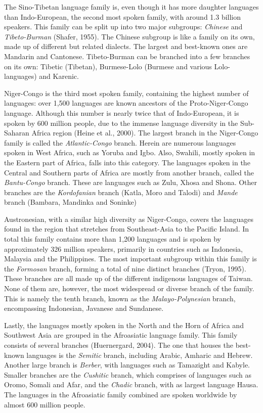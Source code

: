 The Sino-Tibetan language family is, even though it has more daughter languages than Indo-European, the second most spoken family, with around 1.3 billion speakers. This family can be split up into two major subgroups: \textit{Chinese} and \textit{Tibeto-Burman}  (Shafer, 1955). The Chinese subgroup is like a family on its own, made up of different but related dialects. The largest and best-known ones are Mandarin and Cantonese. Tibeto-Burman can be branched into a few branches on its own: Tibetic (Tibetan), Burmese-Lolo (Burmese and various Lolo-languages) and Karenic.  

Niger-Congo is the third most spoken family, containing the highest number of languages: over 1,500 languages are known ancestors of the Proto-Niger-Congo language. Although this number is nearly twice that of Indo-European, it is spoken by 600 million people, due to the immense language diversity in the Sub-Saharan Africa region (Heine et al., 2000). The largest branch in the Niger-Congo family is called the \textit{Atlantic-Congo} branch. Herein are numerous languages spoken in West Africa, such as Yoruba and Igbo. Also, Swahili, mostly spoken in the Eastern part of Africa, falls into this category. The languages spoken in the Central and Southern parts of Africa are mostly from another branch, called the \textit{Bantu-Congo} branch. These are languages such as Zulu, Xhosa and Shona. Other branches are the \textit{Kordofanian} branch (Katla, Moro and Talodi) and \textit{Mande} branch (Bambara, Mandinka and Soninke) 

Austronesian, with a similar high diversity as Niger-Congo, covers the languages found in the region that stretches from Southeast-Asia to the Pacific Island. In total this family contains more than 1,200 languages and is spoken by approximately 326 million speakers, primarily in countries such as Indonesia, Malaysia and the Philippines. The most important subgroup within this family is the \textit{Formosan} branch, forming a total of nine distinct branches (Tryon, 1995). These branches are all made up of the different indigenous languages of Taiwan. None of them are, however, the most widespread or diverse branch of the family. This is namely the tenth branch, known as the \textit{Malayo-Polynesian} branch, encompassing Indonesian, Javanese and Sundanese.  

Lastly, the languages mostly spoken in the North and the Horn of Africa and Southwest Asia are grouped in the Afroasiatic language family.  This family consists of several branches (Huernergard, 2004). The one that houses the best-known languages is the \textit{Semitic} branch, including Arabic, Amharic and Hebrew. Another large branch is \textit{Berber}, with languages such as Tamazight and Kabyle. Smaller branches are the \textit{Cushitic} branch, which comprises of languages such as Oromo, Somali and Afar, and the \textit{Chadic} branch, with as largest language Hausa. The languages in the Afroasiatic family combined are spoken worldwide by almost 600 million people. 


